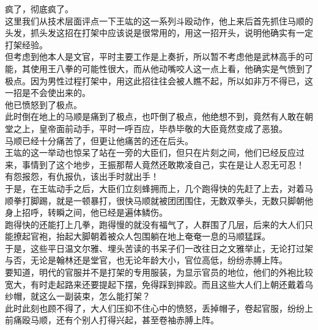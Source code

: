 \begin{multicols}{\theparacolNo}
疯了，彻底疯了。\\

这里我们从技术层面评点一下王竑的这一系列斗殴动作，他上来后首先抓住马顺的头发，抓头发这招在打架中应该说是很常用的，用这一招开头，说明他确实有一定打架经验。\\

但考虑到他本人是文官，平时主要工作是上奏折，所以暂不考虑他是武林高手的可能，其使用王八拳的可能性很大，而从他动嘴咬人这一点上看，他确实是气愤到了极点。因为男性过程打架中，用这此招往往会被人瞧不起，所以如非万不得已，这一招是不会使出来的。\\

他已愤怒到了极点。\\

此时倒在地上的马顺是痛到了极点，也吓倒了极点，他绝想不到，竟然有人敢在朝堂之上，皇帝面前动手，平时一呼百应，毕恭毕敬的大臣竟然变成了恶狼。\\

马顺已经十分痛苦了，但更让他痛苦的还在后头。\\

王竑的这一举动也惊呆了站在一旁的大臣们，但只在片刻之间，他们已经反应过来，事情到了这个地步，王振那帮人竟然还敢欺凌自己，实在是让人忍无可忍！\\

有怨报怨，有仇报仇，该出手时就出手！\\

于是，在王竑动手之后，大臣们立刻蜂拥而上，几个跑得快的先赶了上去，对着马顺拳打脚踢，就是一顿暴打，很快马顺就被团团围住，无数双拳头，无数只脚朝他身上招呼，转瞬之间，他已经是遍体鳞伤。\\

跑得快的还能打上几拳，跑得慢的就没有福气了，人群围了几层，后来的大人们只能撩起官袍，抬起大脚朝着被众人包围躺在地上奄奄一息的马顺猛踩。\\

于是，这些平日温文尔雅、埋头苦读的书呆子们一改往日之文雅举止，无论打过架与否，无论是翰林还是堂官，也无论年龄大小，官位高低，纷纷赤膊上阵。\\

要知道，明代的官服并不是打架的专用服装，为显示官员的地位，他们的外袍比较宽大，有时走起路来还要提起下摆，免得踩到摔跤。而且这些大人们上朝还戴着乌纱帽，就这么一副装束，怎么能打架？\\

此时此刻也顾不得了，大人们压抑不住心中的愤怒，丢掉帽子，卷起官服，纷纷上前痛殴马顺，还有个别人打得兴起，甚至卷袖赤膊上阵。\\


\end{multicols}
